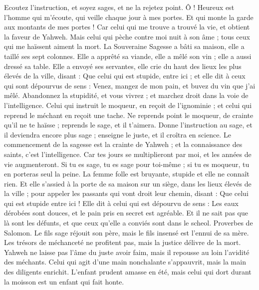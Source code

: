\begin{multicols}{2}
Ecoutez l’instruction, et soyez sages, et ne la rejetez point.
Ô ! Heureux est l'homme qui m'écoute, qui veille chaque jour à mes portes. Et qui monte la garde aux montants de mes portes !
Car celui qui me trouve a trouvé la vie, et obtient la faveur de Yahweh.
Mais celui qui pèche contre moi nuit à son âme ; tous ceux qui me haïssent aiment la mort.
\VerseOne{}La Souveraine Sagesse a bâti sa maison, elle a taillé ses sept colonnes.
Elle a apprêté sa viande, elle a mêlé son vin ; elle a aussi dressé sa table.
Elle a envoyé ses servantes, elle crie du haut des lieux les plus élevés de la ville, disant : 
Que celui qui est stupide, entre ici ; et elle dit à ceux qui sont dépourvus de sens :
Venez, mangez de mon pain, et buvez du vin que j'ai mêlé.
Abandonnez la stupidité, et vous vivrez ; et marchez droit dans la voie de l’intelligence.
Celui qui instruit le moqueur, en reçoit de l’ignominie ; et celui qui reprend le méchant en reçoit une tache.
Ne reprends point le moqueur, de crainte qu'il ne te haïsse ; reprends le sage, et il t'aimera.
Donne l’instruction au sage, et il deviendra encore plus sage ; enseigne le juste, et il croîtra en science.
Le commencement de la sagesse est la crainte de Yahweh ; et la connaissance des saints, c'est l’intelligence.
Car tes jours se multiplieront par moi, et les années de vie augmenteront.
Si tu es sage, tu es sage pour toi-même ; si tu es moqueur, tu en porteras seul la peine.
La femme folle est bruyante, stupide et elle ne connaît rien.
Et elle s’assied à la porte de sa maison sur un siège, dans les lieux élevés de la ville ;
pour appeler les passants qui vont droit leur chemin, disant :
Que celui qui est stupide entre ici ! Elle dit à celui qui est dépourvu de sens :
Les eaux dérobées sont douces, et le pain pris en secret est agréable.
Et il ne sait pas que là sont les défunts, et que ceux qu'elle a conviés sont dans le scheol.
\VerseOne{}Proverbes de Salomon. Le fils sage réjouit son père, mais le fils insensé est l'ennui de sa mère.
Les trésors de méchanceté ne profitent pas, mais la justice délivre de la mort.
Yahweh ne laisse pas l’âme du juste avoir faim, mais il repousse au loin l’avidité des méchants.
Celui qui agit d’une main nonchalante s’appauvrit, mais la main des diligents enrichit.
L'enfant prudent amasse en été, mais celui qui dort durant la moisson est un enfant qui fait honte.

\end{multicols}
